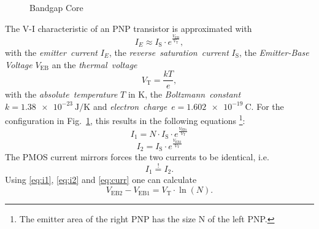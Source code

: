 \documentclass{article}[11pt]
\begin{document}
\notetitle

\cite{razavi-bandgap-16}
\cite{razavi-bandgap-21}

\cite{rinmora-volref-02}
\cite{kok-cmosvoltref-13}

\cite{ma-bandgap-14}
\cite{huang-bandgap-21}


\begin{figure}[H]
  \centering
  \begin{circuitikz}
    
  \end{circuitikz}
  \caption{Bandgap Core}
  \label{fig:badgap-core}
\end{figure}

The V-I characteristic of an PNP transistor is approximated with
\begin{equation}
 I_E \approx I_{\mathrm{S}} \cdot e^{\frac{V_\mathrm{EB}}{V_\mathrm{T}}},
\end{equation}
with the \textit{emitter~current} $I_E$,
the \textit{reverse~saturation~current} $I_{\mathrm{S}}$, the
\textit{Emitter-Base Voltage} $V_\mathrm{EB}$ an the \textit{thermal~voltage}
\begin{equation}\label{eq:vt}
V_\mathrm{T}=\frac{kT}{e},
\end{equation}
with the \textit{absolute~temperature} $T$ in K,
the \textit{Boltzmann~constant}~$k=\SI{1.38e-23}{\joule\per\kelvin}$
and \textit{electron~charge}~$e=\SI{1.602e-19}{\coulomb}$.
For the configuration in Fig.~\ref{fig:badgap-core}, this results in the
following equations
\footnote{The emitter area of the right PNP has the size N of the left PNP.}:
\begin{equation}\label{eq:i1}
 I_1 = N \cdot I_{\mathrm{S}} \cdot e^{\frac{V_\mathrm{EB1}}{V_\mathrm{T}}}
\end{equation}
\begin{equation}\label{eq:i2}
 I_2 = I_{\mathrm{S}} \cdot e^{\frac{V_\mathrm{EB2}}{V_\mathrm{T}}}
\end{equation}
The PMOS current mirrors forces the two currents to be identical, i.e.
\begin{equation}\label{eq:curr}
 I_1 \stackrel{!}{=} I_2.
\end{equation}
Using \eqref{eq:i1}, \eqref{eq:i2} and \eqref{eq:curr} one can calculate
\begin{equation}
V_\mathrm{EB2}-V_\mathrm{EB1} = V_\mathrm{T} \cdot \ln(N).
\end{equation}
\end{document}
